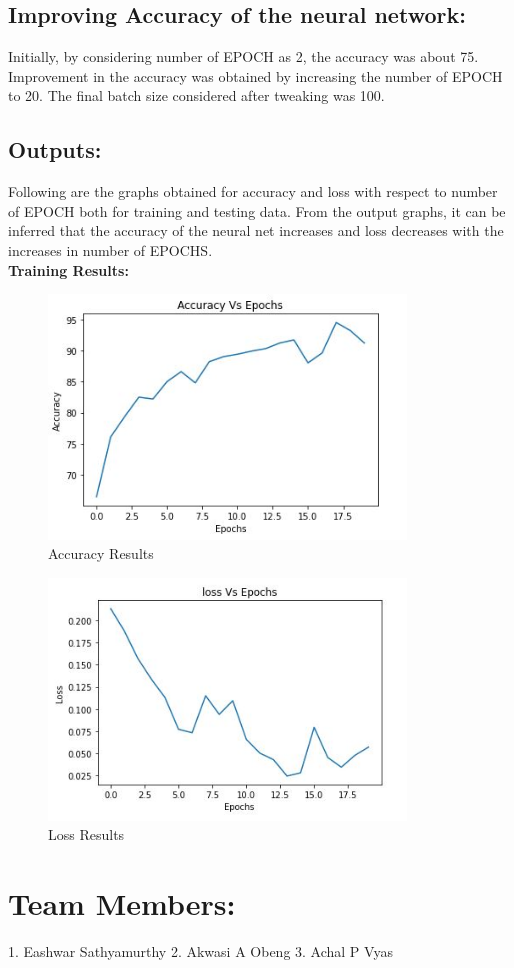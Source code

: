 \documentclass[12pt]{article}
\begin{document}
\begin{enumerate}
\subsection{Improving Accuracy of the neural network:}
Initially, by considering number of EPOCH as 2, the accuracy was about 75. Improvement in the accuracy was obtained by increasing the number of EPOCH  to 20. The final batch size considered after tweaking was 100. 

\subsection{Outputs:}
Following are the graphs obtained for accuracy and loss with respect to number of EPOCH both for training and testing data. From the output graphs, it can be inferred that the accuracy of the neural net increases and loss decreases with the increases in number of EPOCHS.\\
\textbf{Training Results:}
\begin{figure}[h]
    \centering
    \includegraphics[width=9.5cm]{accuracy_train}
    \caption{Accuracy Results}
    \label{fig:Accuracy Results}
\end{figure}
\newpage
\begin{figure}[h]
    \centering
    \includegraphics[width=9.5cm]{loss_train}
    \caption{Loss Results}
    \label{fig:Loss Results}
\end{figure}
\end{enumerate}
\section{Team Members:}
1. Eashwar Sathyamurthy
2. Akwasi A Obeng
3. Achal P Vyas
\end{document}
